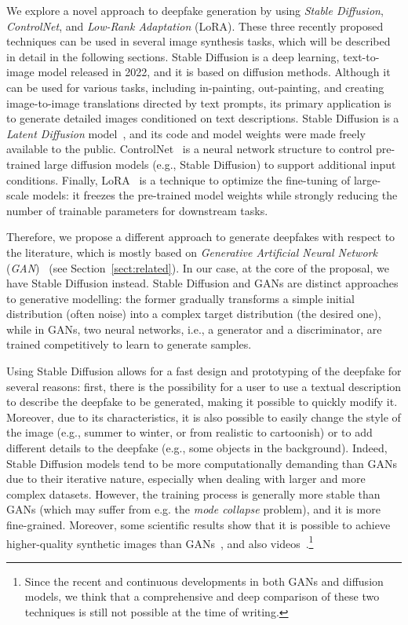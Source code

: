 \documentclass[preprint]{elsarticle}
\begin{document}
We  explore a novel approach to deepfake generation by using  \emph{Stable Diffusion}, \emph{ControlNet}, and \emph{Low-Rank Adaptation} (LoRA). These three recently proposed techniques can be used in several image synthesis tasks, which will be described in detail in the following sections. Stable Diffusion is a deep learning, text-to-image model released in 2022,  and it is based on diffusion methods. Although it can be used for various tasks, including in-painting, out-painting, and creating image-to-image translations directed by text prompts, its primary application is to generate detailed images conditioned on text descriptions. Stable Diffusion is a \emph{Latent Diffusion} model~\cite{rombach2022highresolution}, and its code and model weights were made freely available to the public.
ControlNet~\cite{zhang2023adding} is a neural network structure to control pre-trained large diffusion models (e.g., Stable Diffusion) to support additional input conditions. Finally, LoRA~\cite{hu2021lora} is a technique to optimize the fine-tuning of large-scale models: it freezes the pre-trained model weights while strongly reducing the number of trainable parameters for downstream tasks.

Therefore, we propose a different approach to generate deepfakes with respect to the literature, which is mostly based on \emph{Generative Artificial Neural Network} (\emph{GAN})~\cite{surveydgen1} (see Section~\ref{sect:related}). In our case, at the core of the proposal, we have Stable Diffusion instead. Stable Diffusion and GANs are distinct approaches to generative modelling: the former gradually transforms a simple initial distribution (often noise) into a complex target distribution (the desired one), while in GANs, two neural networks, i.e., a generator and a discriminator, are trained competitively  to learn to generate samples. 

Using Stable Diffusion allows for a fast design and prototyping of the deepfake for several reasons: first, there is the possibility for a user to use a textual description to describe the deepfake to be generated, making it possible to quickly modify it. Moreover, due to its characteristics, it is also possible to easily change the style of the image (e.g., summer to winter, or from realistic to cartoonish) or to add different details to the deepfake (e.g., some objects in the background). Indeed, Stable Diffusion models tend to be more computationally demanding than GANs due to their iterative nature, especially when dealing with larger and more complex datasets. However, the training process is generally more stable than GANs (which may suffer from e.g. the \emph{mode collapse} problem), and  it is more fine-grained. Moreover, some scientific results show that it is possible to achieve higher-quality synthetic images than GANs~\cite{dmbetter,dmbetter2}, and also videos~\cite{dmbetter3}.\footnote{Since the recent and continuous developments in both GANs and diffusion models, we think that a comprehensive and deep comparison of these two techniques is still not possible at the time of writing.}
\end{document}
